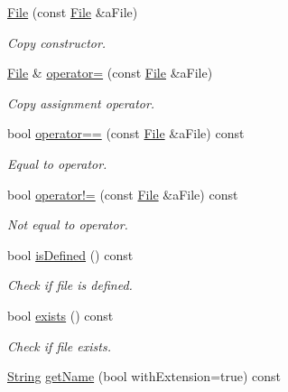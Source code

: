\begin{DoxyCompactItemize}
\item 
\hyperlink{classlibrary_1_1core_1_1fs_1_1_file_a6f3f0d79545ac9984c6f49432f0c6c39}{File} (const \hyperlink{classlibrary_1_1core_1_1fs_1_1_file}{File} \&a\+File)
\begin{DoxyCompactList}\small\item\em Copy constructor. \end{DoxyCompactList}\item 
\hyperlink{classlibrary_1_1core_1_1fs_1_1_file}{File} \& \hyperlink{classlibrary_1_1core_1_1fs_1_1_file_a8143d55e67cf2d6256c7653619a03909}{operator=} (const \hyperlink{classlibrary_1_1core_1_1fs_1_1_file}{File} \&a\+File)
\begin{DoxyCompactList}\small\item\em Copy assignment operator. \end{DoxyCompactList}\item 
bool \hyperlink{classlibrary_1_1core_1_1fs_1_1_file_a44ab79a23c5a129be298a026dbeec62f}{operator==} (const \hyperlink{classlibrary_1_1core_1_1fs_1_1_file}{File} \&a\+File) const
\begin{DoxyCompactList}\small\item\em Equal to operator. \end{DoxyCompactList}\item 
bool \hyperlink{classlibrary_1_1core_1_1fs_1_1_file_a0354b6dd59250c07cd5a8b679dc36d95}{operator!=} (const \hyperlink{classlibrary_1_1core_1_1fs_1_1_file}{File} \&a\+File) const
\begin{DoxyCompactList}\small\item\em Not equal to operator. \end{DoxyCompactList}\item 
bool \hyperlink{classlibrary_1_1core_1_1fs_1_1_file_a2044eecd956aaf55b4c55872485e1bf9}{is\+Defined} () const
\begin{DoxyCompactList}\small\item\em Check if file is defined. \end{DoxyCompactList}\item 
bool \hyperlink{classlibrary_1_1core_1_1fs_1_1_file_a61851886b6bf66cd0f179b6c7bd7f972}{exists} () const
\begin{DoxyCompactList}\small\item\em Check if file exists. \end{DoxyCompactList}\item 
\hyperlink{classlibrary_1_1core_1_1types_1_1_string}{String} \hyperlink{classlibrary_1_1core_1_1fs_1_1_file_ac8ecef1fd249eaf2ab6d7141131c0424}{get\+Name} (bool with\+Extension=true) const

\end{DoxyCompactItemize}
